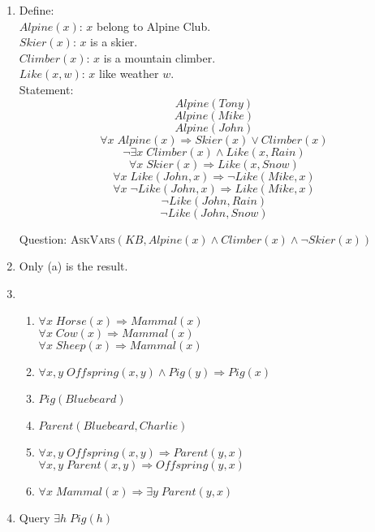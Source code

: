 \documentclass{article}
\begin{document}
\begin{enumerate}
\item Define:\\
 $Alpine(x)$: $x$ belong to Alpine Club. \\
 $Skier(x)$: $x$ is a skier. \\
 $Climber(x)$: $x$ is a mountain climber. \\
 $Like(x,w)$: $x$ like weather $w$. \\

 Statement: \\
 $$Alpine(Tony)$$
 $$Alpine(Mike)$$
 $$Alpine(John)$$
 $$\forall x \; Alpine(x) \Rightarrow Skier(x)\lor Climber(x)$$
 $$\neg\exists x \; Climber(x) \land Like(x,Rain)$$ 
 $$\forall x \; Skier(x) \Rightarrow Like(x,Snow)$$
 $$\forall x \; Like(John,x) \Rightarrow \neg Like(Mike,x)$$
 $$\forall x \; \neg Like(John,x) \Rightarrow Like(Mike,x)$$
 $$\neg Like(John,Rain)$$
 $$\neg Like(John,Snow)$$

 Question: \textsc{AskVars}$(KB, Alpine(x)\land Climber(x)\land \neg Skier(x))$


   


\item Only (a) is the result.


\item 
	\begin{enumerate}
		\item $\forall x \; Horse(x) \Rightarrow Mammal(x)$ \\
			  $\forall x \; Cow(x) \Rightarrow Mammal(x)$ \\
			  $\forall x \; Sheep(x) \Rightarrow Mammal(x)$ \\
			   
		\item $\forall x,y \; \mathit{Offspring}(x,y)\land Pig(y) \Rightarrow Pig(x)$ \\
			  
		\item $Pig(Bluebeard)$
		\item $Parent(Bluebeard,Charlie)$
		\item $\forall x,y \; \mathit{Offspring}(x,y) \Rightarrow Parent(y,x)$\\
			$\forall x,y \; Parent(x,y) \Rightarrow \mathit{Offspring}(y,x)$
		\item $\forall x \; Mammal(x) \Rightarrow \exists y \; Parent(y,x)$  
	\end{enumerate}


\item Query $\exists h \; Pig(h)$


\end{enumerate}
\end{document}
